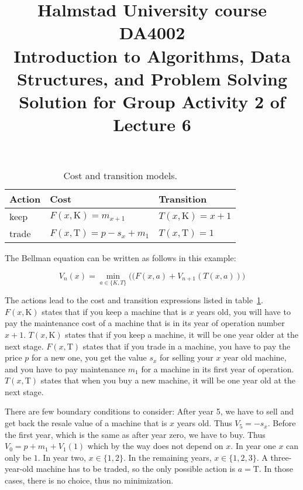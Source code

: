 \documentclass[a4paper]{article}
\begin{document}
\title{
  {\small
    Halmstad University course DA4002\\
    Introduction to Algorithms, Data Structures, and Problem Solving\\
  }
  Solution for Group Activity 2 of Lecture 6
}
\maketitle

\begin{table}
  \caption{Cost and transition models.}\label{tab:actions}
  \centering
  \begin{tabular}{lll}
    \toprule
    Action & Cost & Transition \\
    \midrule
    keep   & $F(x,\text{K}) = m_{x+1}$       & $T(x,\text{K}) = x+1$ \\
    trade  & $F(x,\text{T}) = p - s_x + m_1$ & $T(x,\text{T}) = 1$ \\
    \bottomrule
  \end{tabular}
\end{table}

The Bellman equation can be written as follows in this example:

\begin{equation}
  V_n(x) = \min_{a\in\{K,T\}} \big((F(x,a) + V_{n+1}(T(x,a)) \big)
\end{equation}

The actions lead to the cost and transition expressions listed in table~\ref{tab:actions}.
$F(x,\text{K})$ states that if you keep a machine that is $x$ years old, you will have to pay the maintenance cost of a machine that is in its year of operation number $x+1$.
$T(x,\text{K})$ states that if you keep a machine, it will be one year older at the next stage.
$F(x,\text{T})$ states that if you trade in a machine, you have to pay the price $p$ for a new one, you get the value $s_x$ for selling your $x$ year old machine, and you have to pay maintenance $m_1$ for a machine in its first year of operation.
$T(x,\text{T})$ states that when you buy a new machine, it will be one year old at the next stage.

There are few boundary conditions to consider:
After year 5, we have to sell and get back the resale value of a machine that is $x$ years old.
Thus $V_5 = -s_x$.
Before the first year, which is the same as after year zero, we have to buy.
Thus $V_0 = p + m_1 + V_1(1)$ which by the way does not depend on $x$.
In year one $x$ can only be $1$.
In year two, $x\in\{1,2\}$.
In the remaining years, $x\in\{1,2,3\}$.
A three-year-old machine has to be traded, so the only possible action is $a=\text{T}$.
In those cases, there is no choice, thus no minimization.
\end{document}
